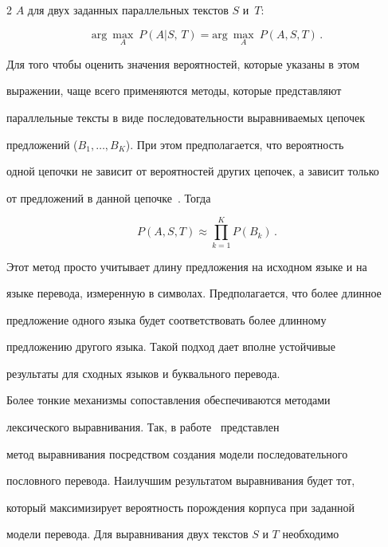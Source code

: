 \begin{multicols}{2}
$A$ для двух заданных параллельных текстов $S$ и~$T$:


$$


\mathrm{arg}\ \underset{A}{\max}\  P (A\vert S,\,T) =


\mathrm{arg}\  \underset{A}{\max}\  P(A,S,T)\,.


$$





Для того чтобы оценить значения вероятностей, которые указаны в этом


выражении, чаще всего применяются методы, которые пред\-став\-ля\-ют


параллельные тексты в виде последовательности выравниваемых цепочек


предложений ($B_1, \ldots , B_K$).  При этом предполагается, что вероятность


одной цепочки не зависит от вероятностей других цепочек, а зависит только


от предложений в данной цепочке~\cite{38koz}. Тогда


$$


P(A,S,T) \approx \prod\limits_{k=1}^K P(B_k)\,.


$$





Этот метод просто учитывает длину предложения на исходном языке и на


языке перевода, измеренную в символах. Предполагается, что более длинное


предложение одного языка будет соответствовать более длинному


предложению другого языка. Такой подход дает вполне устойчивые


результаты для сходных языков и буквального перевода.





Более тонкие механизмы сопоставления обеспечиваются методами


лексического выравнивания. Так, в работе~\cite{39koz} представлен


метод выравнивания посредством создания модели последовательного


пословного перевода. Наилучшим результатом выравнивания будет тот,


который максимизирует вероятность порождения корпуса при заданной


модели перевода. Для выравнивания двух текстов $S$ и $T$ необходимо



\end{multicols}
